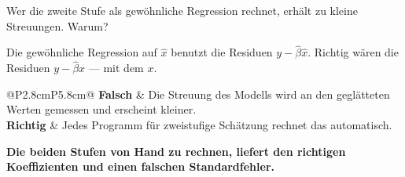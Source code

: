\begin{aufgabe}
Wer die zweite Stufe als gewöhnliche Regression rechnet, erhält zu kleine Streuungen. Warum?

\loesung
{}
Die gewöhnliche Regression auf $\hat x$ benutzt die Residuen $y - \hat\beta\hat x$. Richtig wären die Residuen $y - \hat\beta x$ --- mit dem  $x$.

\begin{center}
{\small
\renewcommand{\arraystretch}{1.5}
\begin{tabular}{@{}P{2.8cm}P{5.8cm}@{}}
\toprule
\textbf{Falsch} & Die Streuung des Modells wird an den geglätteten Werten gemessen und erscheint kleiner.\\
\textbf{Richtig} & Jedes Programm für zweistufige Schätzung rechnet das automatisch.\\
\bottomrule
\end{tabular}}
\end{center}

\begin{center}
\begin{minipage}{0.9\textwidth}
\textbf{Die beiden Stufen von Hand zu rechnen, liefert den richtigen Koeffizienten und einen falschen Standardfehler.}
\end{minipage}
\end{center}

\begin{center}
\begin{minipage}{0.88\textwidth}
\end{minipage}
\end{center}
\end{aufgabe}

